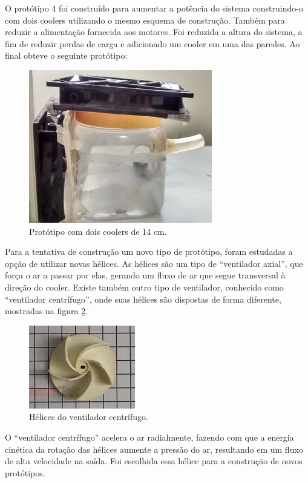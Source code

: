 		O protótipo 4 foi construído para aumentar a potência do sistema construindo-o com dois coolers utilizando o mesmo esquema de construção. Também para reduzir a alimentação fornecida aos motores. Foi reduzida a altura do sistema, a fim de reduzir perdas de carga e adicionado um cooler em uma das paredes. Ao final obteve o seguinte protótipo:

		\begin{figure}[H]
			\centering
			\includegraphics[scale=1]{figuras/asppc2_4.jpg}
			\caption{Protótipo com dois coolers de 14 cm.}
			\label{img:coolers_14cm}
		\end{figure}

		Para a tentativa de construção um novo tipo de protótipo, foram estudadas a opção de utilizar novas hélices. As hélices são um tipo de “ventilador axial”, que força o ar a passar por elas, gerando um fluxo de ar que segue transversal à direção do cooler. Existe também outro tipo de ventilador, conhecido como “ventilador centrífugo”, onde suas hélices são dispostas de forma diferente, mostradas na figura \ref{img:ventilador_centrífugo}.

		\begin{figure}[H]
			\centering
			\includegraphics[scale=1]{figuras/asppc2_5.jpg}
			\caption{Hélices do ventilador centrífugo.}
			\label{img:ventilador_centrífugo}
		\end{figure}

		O “ventilador centrífugo” acelera o ar radialmente, fazendo com que a energia cinética da rotação das hélices aumente a pressão do ar, resultando em um fluxo de alta velocidade na saída. Foi escolhida essa hélice para a construção de novos protótipos.

